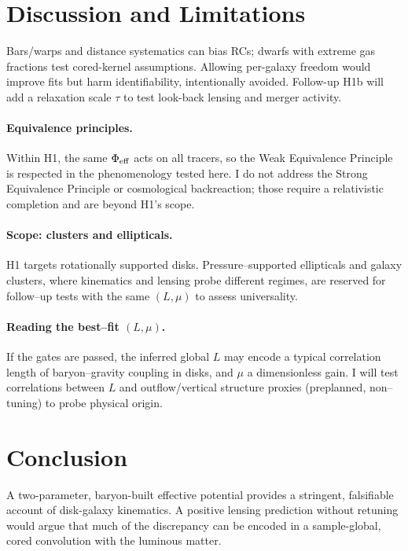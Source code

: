 		
		\section{Discussion and Limitations}\label{sec:discussion}
		Bars/warps and distance systematics can bias RCs; dwarfs with extreme gas fractions test cored-kernel assumptions. Allowing per-galaxy freedom would improve fits but harm identifiability, intentionally avoided. Follow-up H1b will add a relaxation scale $\tau$ to test look-back lensing and merger activity.
		\paragraph{Equivalence principles.}
		Within H1, the same $\Phi_{\rm eff}$ acts on all tracers, so the Weak Equivalence Principle is respected in the phenomenology tested here. I do not address the Strong Equivalence Principle or cosmological backreaction; those require a relativistic completion and are beyond H1's scope.
		
		\paragraph{Scope: clusters and ellipticals.}
		H1 targets rotationally supported disks. Pressure--supported ellipticals and galaxy clusters, where kinematics and lensing probe different regimes, are reserved for follow--up tests with the same $(L,\mu)$ to assess universality.
		
		\paragraph{Reading the best--fit $(L,\mu)$.}
		If the gates are passed, the inferred global $L$ may encode a typical correlation length of baryon--gravity coupling in disks, and $\mu$ a dimensionless gain. I will test correlations between $L$ and outflow/vertical structure proxies (preplanned, non--tuning) to probe physical origin.
		
		
		\section{Conclusion}\label{sec:conclusion}
		A two-parameter, baryon-built effective potential provides a stringent, falsifiable account of disk-galaxy kinematics. A positive lensing prediction without retuning would argue that much of the discrepancy can be encoded in a sample-global, cored convolution with the luminous matter.
		
